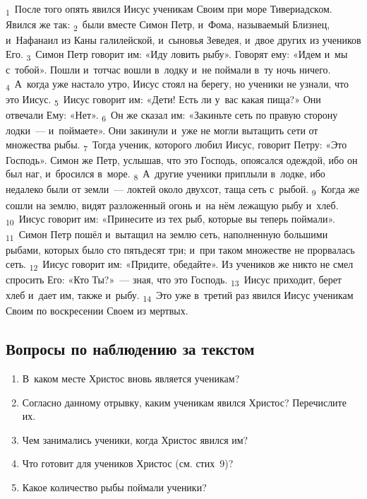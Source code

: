 \documentclass[a4paper,12pt]{article}
\begin{document}
\textsubscript{1}~После того опять явился Иисус ученикам Своим при море Тивериадском. Явился же так: \textsubscript{2}~были вместе Симон Петр, и~Фома, называемый Близнец, и~Нафанаил из Каны галилейской, и~сыновья Зеведея, и~двое других из учеников Его. \textsubscript{3}~Симон Петр говорит им: «Иду ловить рыбу». Говорят ему: «Идем и~мы с~тобой». Пошли и~тотчас вошли в~лодку и~не поймали в~ту ночь ничего. \textsubscript{4}~А~когда уже настало утро, Иисус стоял на берегу, но ученики не узнали, что это Иисус. \textsubscript{5}~Иисус говорит им: «Дети! Есть ли у~вас какая пища?» Они отвечали Ему: «Нет». \textsubscript{6}~Он же сказал им: «Закиньте сеть по правую сторону лодки~--- и~поймаете». Они закинули и~уже не могли вытащить сети от множества рыбы. \textsubscript{7}~Тогда ученик, которого любил Иисус, говорит Петру: «Это Господь». Симон же Петр, услышав, что это Господь, опоясался одеждой, ибо он был наг, и~бросился в~море. \textsubscript{8}~А~другие ученики приплыли в~лодке, ибо недалеко были от земли~--- локтей около двухсот, таща сеть с~рыбой. \textsubscript{9}~Когда же сошли на землю, видят разложенный огонь и~на нём лежащую рыбу и~хлеб. \textsubscript{10}~Иисус говорит им: «Принесите из тех рыб, которые вы теперь поймали». \textsubscript{11}~Симон Петр пошёл и~вытащил на землю сеть, наполненную большими рыбами, которых было сто пятьдесят три; и~при таком множестве не прорвалась сеть. \textsubscript{12}~Иисус говорит им: «Придите, обедайте». Из учеников же никто не смел спросить Его: «Кто Ты?»~--- зная, что это Господь. \textsubscript{13}~Иисус приходит, берет хлеб и~дает им, также и~рыбу. \textsubscript{14}~Это уже в~третий раз явился Иисус ученикам Своим по воскресении Своем из мертвых. 

\subsection*{Вопросы по наблюдению за текстом}
\begin{enumerate}
    \item В~каком месте Христос вновь является ученикам? 
    
    \myline
    
    \myline
    \item Согласно данному отрывку, каким ученикам явился Христос? Перечислите их. 
    
    \myline
    
    \myline
    \item Чем занимались ученики, когда Христос явился им? 
    
    \myline
    
    \myline
    \item Что готовит для учеников Христос (см. стих~9)? 
    
    \myline
    
    \myline
    \item Какое количество рыбы поймали ученики? 
    
    \myline
    
    \myline
\end{enumerate}
\end{document}
